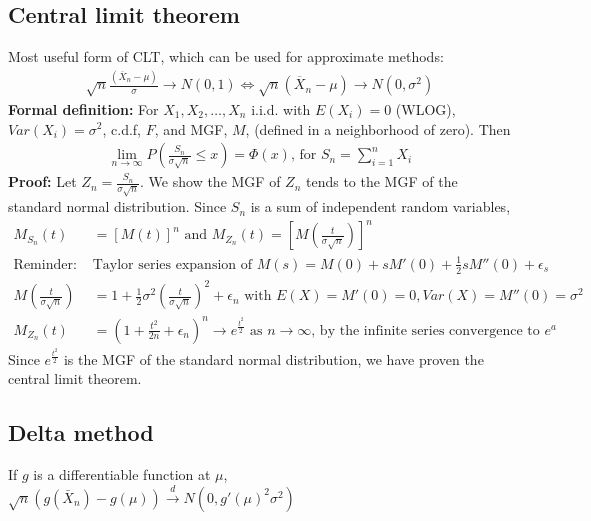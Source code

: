 \documentclass{article}
\begin{document}
\subsection{Central limit theorem}
Most useful form of CLT, which can be used for approximate methods:
\begin{align*}
	\sqrt{n}\frac{(\overline{X}_n - \mu)}{\sigma} \longrightarrow N(0, 1) \Longleftrightarrow \sqrt{n}(\overline{X}_n - \mu) \longrightarrow N(0, \sigma^2)
\end{align*}
\textbf{Formal definition:} For $X_1, X_2, \dots, X_n$ i.i.d. with $E(X_i) = 0$ (WLOG),  $Var(X_i) = \sigma^2$, c.d.f, $F$, and MGF, $M$, (defined in a neighborhood of zero). Then
\begin{align*}
	\lim_{n \rightarrow \infty}P(\frac{S_n}{\sigma \sqrt{n}} \leq x) = \Phi(x) \textrm{, for } S_n = \sum_{i=1}^nX_i
\end{align*}
\textbf{Proof:} Let $Z_n  = \frac{S_n}{\sigma \sqrt{n}}$. We show the MGF of $Z_n$ tends to the MGF of the standard normal distribution. Since $S_n$ is a sum of independent random variables,
\begin{align*}
	M_{S_n}(t) &= [M(t)]^n \textrm{ and } M_{Z_n}(t) = [M(\frac{t}{\sigma \sqrt{n}})]^n\\
	\textrm{Reminder: } & \textrm{Taylor series expansion of } M(s) = M(0)+sM'(0)+ \frac{1}{2}sM''(0) + \epsilon_s \\
	M(\frac{t}{\sigma\sqrt{n}}) &= 1 + \frac{1}{2}\sigma^2(\frac{t}{\sigma \sqrt{n}})^2 + \epsilon_n \textrm{ with } E(X) = M'(0) = 0, Var(X) = M''(0) = \sigma^2\\
	M_{Z_n}(t) &= (1 + \frac{t^2}{2n} + \epsilon_n)^n \longrightarrow e^{\frac{t^2}{2}} \textrm{ as } n \longrightarrow \infty \textrm{, by the infinite series convergence to $e^a$}
\end{align*}
Since $e^{\frac{t^2}{2}}$ is the MGF of the standard normal distribution, we have proven the central limit theorem.

\subsection{Delta method}
If $g$ is a differentiable function at $\mu$, $\sqrt{n}(g(\bar{X}_n) - g(\mu)) \overset{d}{\longrightarrow} N(0, g'(\mu)^2\sigma^2)$
\end{document}
